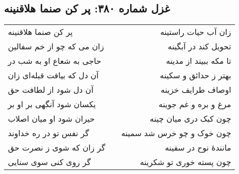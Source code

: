 \begin{center}
\section*{غزل شماره ۳۸۰: پر کن صنما هلاقنینه}
\label{sec:380}
\begin{longtable}{l p{0.5cm} r}
پر کن صنما هلاقنینه
&&
زان آب حیات راستینه
\\
زان می که چو از خم سفالین
&&
تحویل کند در آبگینه
\\
حاجی به شعاع او به شب در
&&
تا مکه ببیند از مدینه
\\
آن دل که بیافت قبله‌ای زان
&&
بهتر ز حدائق و سکینه
\\
آن دل شود از لطافت حق
&&
اوصاف طرایف خزینه
\\
یکسان شود آنگهی بر او بر
&&
مرغ و بره و غم جوینه
\\
حیران شود او میان اصلاب
&&
چون کبک دری میان چینه
\\
گر نفس تو در ره خداوند
&&
چون خوک و چو خرس شد سمینه
\\
گر زان که شوی ز نصرت حق
&&
مانندهٔ نوح در سفینه
\\
گر روی کنی سوی سنایی
&&
چون پسته خوری تو شکرینه
\\
\end{longtable}
\end{center}
